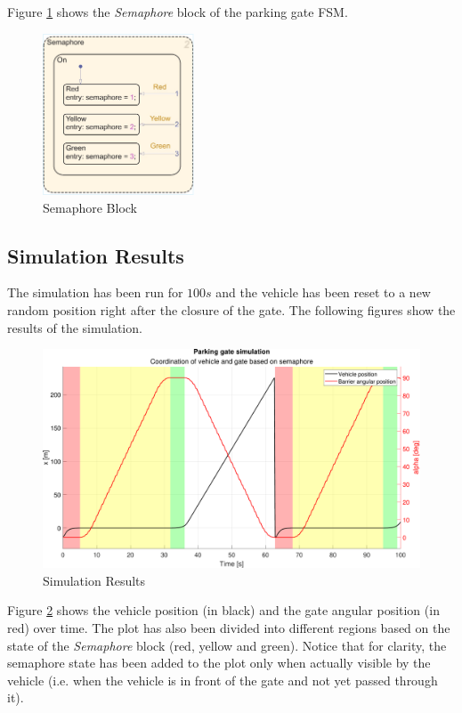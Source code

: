 Figure \ref{fig:semaphore_block} shows the \textit{Semaphore} block of the parking gate FSM.

\begin{figure}[H]
    \centering
    \includegraphics[width=0.4\textwidth]{./img/MATLAB/semaphore_block.pdf}
    \caption{Semaphore Block}
    \label{fig:semaphore_block}
\end{figure}



\subsection{Simulation Results}
\label{subsec:simulation_results}

The simulation has been run for $100s$ and the vehicle has been reset to a new random position right after the closure of the gate.
The following figures show the results of the simulation.

\begin{figure}[H]
    \centering
    \includegraphics[width=1.0\textwidth]{./img/MATLAB/results.pdf}
    \caption{Simulation Results}
    \label{fig:simulation_results}
\end{figure}

Figure \ref{fig:simulation_results} shows the vehicle position (in black) and the gate angular position (in red) over time.
The plot has also been divided into different regions based on the state of the \textit{Semaphore} block (red, yellow and green).
Notice that for clarity, the semaphore state has been added to the plot only when actually visible by the vehicle (i.e. when the vehicle is in front of the gate and not yet passed through it).

